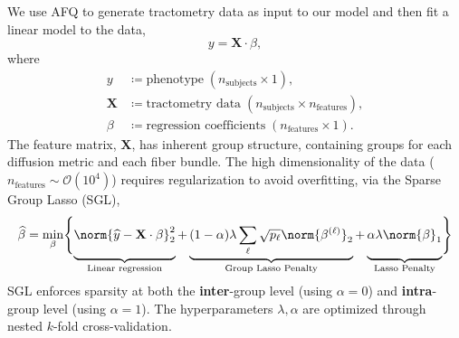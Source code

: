 \documentclass[a0paper,landscape,fontscale=0.395]{baposter}
\begin{document}
\begin{poster}
{\begin{multicols}{2}
\begingroup
We use AFQ to generate tractometry data as input to our model and then fit a linear model to the data,
\begin{equation*}
    y = \mathbf{X} \cdot \beta,
\end{equation*}
\vspace{-2.25em}
where
\begin{align*}
    y &\coloneqq \text{phenotype} \; (n_\text{subjects} \times 1), \\
    \mathbf{X} &\coloneqq \text{tractometry data} \; (n_\text{subjects} \times n_\text{features}), \\
    \beta &\coloneqq \text{regression coefficients} \; (n_\text{features} \times 1).
\end{align*}
The feature matrix, $\mathbf{X}$, has inherent group structure, containing groups for each diffusion metric and each fiber bundle.
The high dimensionality of the data ($n_\text{features} \sim \mathcal{O}(10^4)$) requires regularization to avoid overfitting, via the Sparse Group Lasso (SGL),
\vspace{-0.5em}
\begin{equation*}
    \widehat{\beta} = \min_\beta \Biggl\{
        \underbrace{
            \vphantom{(1 - \alpha) \lambda \displaystyle \sum_\ell \sqrt{p_\ell} \norm{\beta^{(\ell)}}_2}
            \norm{\widehat{y} - \mathbf{X} \cdot \beta}_2^2
        }_{\text{Linear regression}}
        + \underbrace{
            (1 - \alpha) \lambda \displaystyle \sum_\ell \sqrt{p_\ell} \norm{\beta^{(\ell)}}_2
        }_{\text{Group Lasso Penalty}}
        + \underbrace{
            \vphantom{(1 - \alpha) \lambda \displaystyle \sum_\ell \sqrt{p_\ell} \norm{\beta^{(\ell)}}_2}
            \alpha \lambda \norm{\beta}_1
        }_{\text{Lasso Penalty}}
    \Biggl\}
\end{equation*}
SGL enforces sparsity at both the \textbf{inter}-group level (using $\alpha =
0$) and \textbf{intra}-group level (using $\alpha = 1$). The hyperparameters
$\lambda, \alpha$ are optimized through nested $k$-fold
cross-validation.
\endgroup
\end{multicols}
}


\end{poster}
\end{document}
